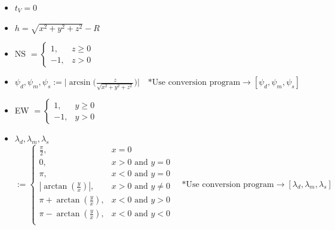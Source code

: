 \documentclass[11pt]{article}
\theoremstyle{definition}
\newcommand{\1}[1]{\mathbf{1} \left \{ #1 \right \}}
\begin{document}
\begin{itemize}
    \item \(t_V = 0\)
    \item \(h = \sqrt{x^2 + y^2 + z^2} - R\)
    \item NS $=
        \begin{cases}
        1,& z \geq 0 \\
        -1,& z>0
        \end{cases}$
    \item \(\psi_d, \psi_m, \psi_s := \Bigg| \arcsin \Big(\frac{z}{\sqrt{x^2 + y^2 + z^2}}\Big) \Bigg| \quad \textrm{*Use conversion program} \rightarrow [\psi_d, \psi_m, \psi_s]\)
    \item EW $=
        \begin{cases}
        1,& y \geq 0 \\
        -1,& y>0
        \end{cases}$
    \item \(\lambda_d, \lambda_m, \lambda_s\) $:=
        \begin{cases}
        \frac{\pi}{2},& x = 0 \\
        0,& x>0 \text{ and } y=0 \\
        \pi,& x<0 \text{ and } y=0 \\
        \left|\arctan \left(\frac{y}{x}\right)\right|,& x>0 \text{ and } y \neq 0 \\
        \pi + \arctan \left(\frac{y}{x}\right),& x<0 \text{ and } y>0 \\
        \pi - \arctan \left(\frac{y}{x}\right),& x<0 \text{ and } y<0 \\
        \end{cases} \quad \text{*Use conversion program} \rightarrow \left[\lambda_d, \lambda_m, \lambda_s\right]$
\end{itemize}
\end{document}
